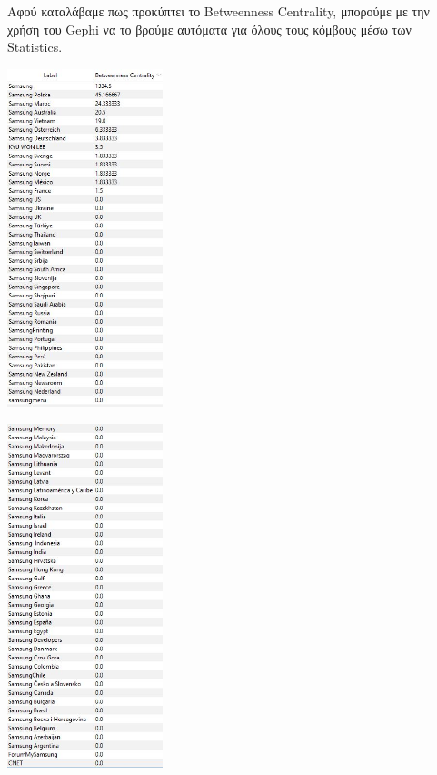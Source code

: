 \documentclass[12pt]{article}
\begin{document}
	\vspace{12pt}
	\vspace{12pt}
	Αφού καταλάβαμε πως προκύπτει το Betweenness Centrality, μπορούμε με την χρήση του Gephi να το βρούμε αυτόματα για όλους τους κόμβους μέσω των Statistics.
	\begin{center}
		\begin{adjustbox}{valign=t}
			\includegraphics[width=0.34\textwidth]{photos-files/section7/betweenness_centrality1.JPG}
		\end{adjustbox}
		\hfill
		\begin{adjustbox}{valign=t}
			\includegraphics[width=0.34\textwidth]{photos-files/section7/betweenness_centrality2.JPG}
		\end{adjustbox}
	\end{center}
\end{document}
